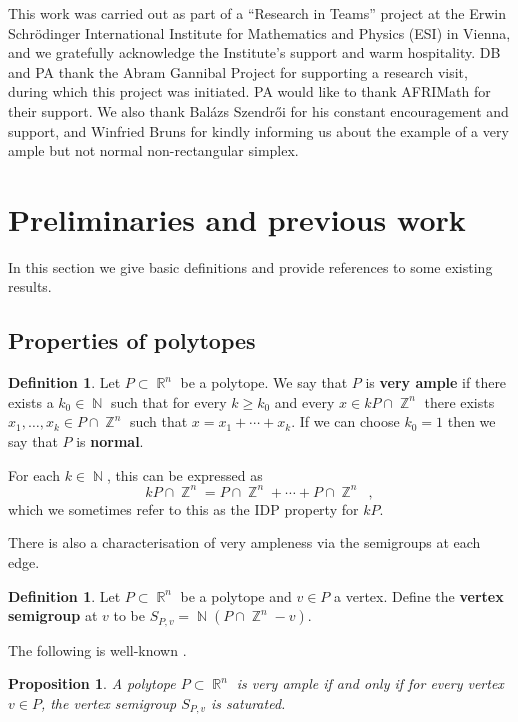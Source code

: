 \documentclass[a4paper,11pt]{amsart}
\theoremstyle{plain}
\newtheorem{proposition}[theorem]{Proposition}
\theoremstyle{definition}
\newtheorem{definition}[theorem]{Definition}
\theoremstyle{remark}
\DeclareMathOperator{\NN}{\mathbb{N}}
\DeclareMathOperator{\ZZ}{\mathbb{Z}}
\DeclareMathOperator{\RR}{\mathbb{R}}
\begin{document}
This work was carried out as part of a “Research in Teams” project at the Erwin Schrödinger International Institute for Mathematics and Physics (ESI) in Vienna, and we gratefully acknowledge the Institute’s support and warm hospitality. 
DB and PA thank the Abram Gannibal Project for supporting a research visit, during which this project was initiated. 
PA would like to thank AFRIMath for their support.
We also thank Balázs Szendrői for his constant encouragement and support, and Winfried Bruns for kindly informing us about the example of a very ample but not normal non-rectangular simplex.

\section{Preliminaries and previous work}

In this section we give basic definitions and provide references to some existing results.

\subsection{Properties of polytopes} \hfill

\begin{definition}\label{definition:normal-very-ample}
    Let $P \subset \RR^n$ be a polytope.
    We say that $P$ is \textbf{very ample} if there exists a $k_0 \in \NN$ such that for every $k \geq k_0$ and every $x \in kP \cap \ZZ^n$ there exists $x_1 , \dots , x_k \in P \cap \ZZ^n$ such that $x = x_1 + \cdots + x_k$.
    If we can choose $k_0 = 1$ then we say that $P$ is \textbf{normal}.
\end{definition}

For each $k \in \NN$, this can be expressed as
\[kP \cap \ZZ^n = P \cap \ZZ^n + \cdots + P \cap \ZZ^n \enspace ,\]
which we sometimes refer to this as the IDP property for $kP$.

There is also a characterisation of very ampleness via the semigroups at each edge.

\begin{definition}
Let $P \subset \RR^n$ be a polytope and $v \in P$ a vertex.
Define the \textbf{vertex semigroup} at $v$ to be $S_{P,v} = \NN(P \cap \ZZ^n - v)$.
\end{definition}

The following is well-known \cite[Exercise 2.23]{BrunsGubeladze:2009}.

\begin{proposition}\label{prop:very-ample-saturated}
A polytope $P \subset \RR^n$ is very ample if and only if for every vertex $v \in P$, the vertex semigroup $S_{P,v}$ is saturated.
\end{proposition}
\end{document}
